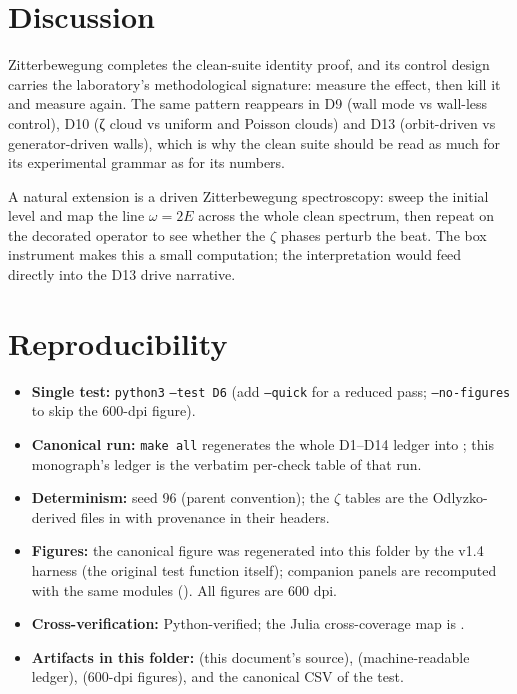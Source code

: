 \documentclass[11pt,a4paper]{article}
\begin{document}
\section{Discussion}
Zitterbewegung completes the clean-suite identity proof, and its control design carries the laboratory's methodological signature: measure the effect, then kill it and measure again. The same pattern reappears in D9 (wall mode vs wall-less control), D10 (ζ cloud vs uniform and Poisson clouds) and D13 (orbit-driven vs generator-driven walls), which is why the clean suite should be read as much for its experimental grammar as for its numbers.

A natural extension is a driven Zitterbewegung spectroscopy: sweep the initial level and map the line $\omega = 2E$ across the whole clean spectrum, then repeat on the decorated operator to see whether the $\zeta$ phases perturb the beat. The box instrument makes this a small computation; the interpretation would feed directly into the D13 drive narrative.

\section{Reproducibility}
\begin{itemize}[leftmargin=1.2em, itemsep=0.15em]
\item \textbf{Single test:} \texttt{python3}  \texttt{--test D6} (add \texttt{--quick} for a reduced pass; \texttt{--no-figures} to skip the 600-dpi figure).
\item \textbf{Canonical run:} \texttt{make all} regenerates the whole D1--D14 ledger into ; this monograph's ledger is the verbatim per-check table of that run.
\item \textbf{Determinism:} seed 96 (parent convention); the $\zeta$ tables are the Odlyzko-derived files in  with provenance in their headers.
\item \textbf{Figures:} the canonical figure was regenerated into this folder by the v1.4 harness (the original test function itself); companion panels are recomputed with the same modules (). All figures are 600 dpi.
\item \textbf{Cross-verification:} Python-verified; the Julia cross-coverage map is .
\item \textbf{Artifacts in this folder:}  (this document's source),  (machine-readable ledger),  (600-dpi figures), and the canonical CSV of the test.
\end{itemize}
\end{document}
